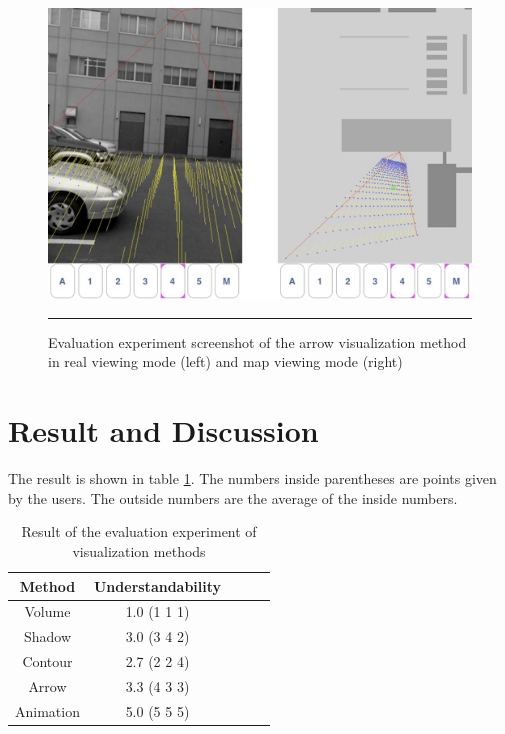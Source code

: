 \begin{figure}[htbp]
	\centering
	\includegraphics[width=14cm]{./Primitives/experiment_screenshot.png}
	\rule{35em}{0.5pt}
	\caption[Evaluation experiment screenshot]{Evaluation experiment screenshot of the arrow visualization method in real viewing mode (left) and map viewing mode (right)}
	\label{fig:ExperimentScreenshot}
\end{figure}


\section{Result and Discussion}

The result is shown in table \ref{tb:ExperimentResult}. The numbers inside parentheses are points given by the users. The outside numbers are the average of the inside numbers.

\begin{table}[tb]
	\begin{center}
		\caption{Result of the evaluation experiment of visualization methods}
		\label{tb:ExperimentResult}
		\begin{tabular}{|c|c|c|c|c|}
			\hline
			Method    & Understandability \\
			\hline
			Volume    & 1.0 (1 1 1) \\
			Shadow    & 3.0 (3 4 2) \\
			Contour   & 2.7 (2 2 4) \\
			Arrow     & 3.3 (4 3 3) \\
			Animation & 5.0 (5 5 5) \\
			\hline
		\end{tabular}
	\end{center}
\end{table}

